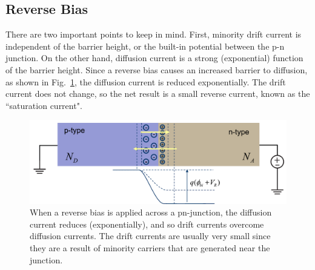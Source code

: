 \subsection{Reverse Bias}
There are two important points to keep in mind.  First, minority drift current is independent of the barrier height, or the built-in potential between the p-n junction.  On the other hand, diffusion current is a strong (exponential) function of the barrier height.  Since a reverse bias causes an increased barrier to diffusion, as shown in Fig.~\ref{fig:slide36}, the diffusion current is reduced exponentially.  The drift current does not change, so the net result is a small reverse current, known as the ``saturation current".  
\begin{figure}[tb]
\begin{center}
\includegraphics[width=.75\columnwidth]{slide36}
\end{center}
\caption{When a reverse bias is applied across a pn-junction, the diffusion current reduces (exponentially), and so drift currents overcome diffusion currents.  The drift currents are usually very small since they are a result of minority carriers that are generated near the junction. } \label{fig:slide36}
\end{figure}
